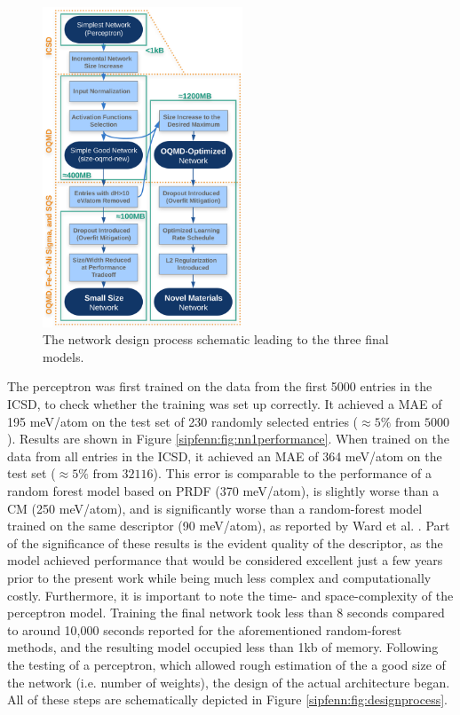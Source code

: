 \begin{figure}
    \centering
    \includegraphics[width=0.53\textwidth]{sipfenn/SIPFENN_design_updated.png}
    \caption{The network design process schematic leading to the three final models.}
\end{figure}

The perceptron was first trained on the data from the first 5000 entries in the ICSD, to check whether the training was set up correctly. It achieved a MAE of 195 meV/atom on the test set of 230 randomly selected entries ($\approx 5\% \text{ from } 5000$). Results are shown in Figure \ref{sipfenn:fig:nn1performance}. When trained on the data from all entries in the ICSD, it achieved an MAE of 364 meV/atom on the test set ($\approx5\% \text{ from } 32116$). This error is comparable to the performance of a random forest model based on PRDF (370 meV/atom), is slightly worse than a CM (250 meV/atom), and is significantly worse than a random-forest model trained on the same descriptor (90 meV/atom), as reported by Ward et al. \cite{Ward2017IncludingTessellations}. Part of the significance of these results is the evident quality of the descriptor, as the model achieved performance that would be considered excellent just a few years prior to the present work while being much less complex and computationally costly. Furthermore, it is important to note the time- and space-complexity of the perceptron model. Training the final network took less than 8 seconds compared to around 10,000 seconds reported for the aforementioned random-forest methods, and the resulting model occupied less than 1kb of memory. Following the testing of a perceptron, which allowed rough estimation of the a good size of the network (i.e. number of weights), the design of the actual architecture began. All of these steps are schematically depicted in Figure \ref{sipfenn:fig:designprocess}.

